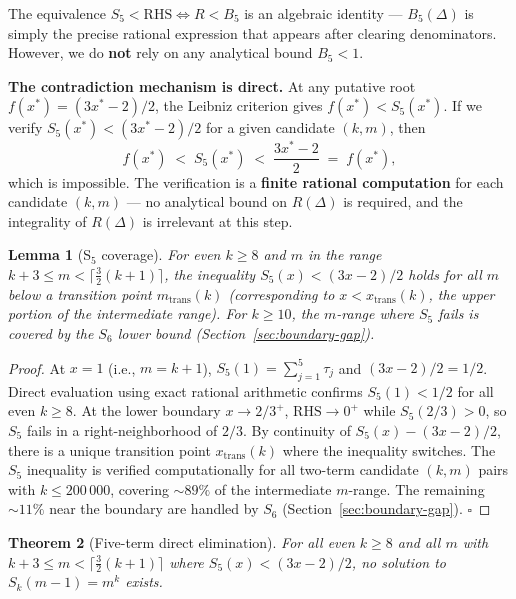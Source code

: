 \documentclass[12pt,a4paper]{article}
\theoremstyle{plain}
\newtheorem{theorem}{Theorem}[section]
\newtheorem{lemma}[theorem]{Lemma}
\theoremstyle{definition}
\begin{document}
The equivalence $S_5 < \mathrm{RHS} \iff R < B_5$ is an algebraic
identity --- $B_5(\Delta)$ is simply the precise rational expression
that appears after clearing denominators.  However, we do \textbf{not}
rely on any analytical bound $B_5 < 1$.

\textbf{The contradiction mechanism is direct.}
At any putative root $f(x^*) = (3x^*-2)/2$, the Leibniz criterion gives
$f(x^*) < S_5(x^*)$.  If we verify $S_5(x^*) < (3x^*-2)/2$ for a given
candidate $(k,m)$, then
\[
  f(x^*) \; < \; S_5(x^*) \; < \; \frac{3x^*-2}{2} \; = \; f(x^*),
\]
which is impossible.  The verification is a \textbf{finite rational
computation} for each candidate $(k,m)$ --- no analytical bound on
$R(\Delta)$ is required, and the integrality of $R(\Delta)$ is
irrelevant at this step.

\begin{lemma}[S$_5$ coverage]\label{lem:S5-coverage}
  For even $k \ge 8$ and $m$ in the range $k+3 \le m <
  \lceil\frac{3}{2}(k+1)\rceil$, the inequality
  $S_5(x) < (3x-2)/2$ holds for all $m$ below a transition point
  $m_{\mathrm{trans}}(k)$ (corresponding to $x < x_{\mathrm{trans}}(k)$,
  the upper portion of the intermediate range).  For $k \ge 10$, the
  $m$-range where $S_5$ fails is covered by the $S_6$ lower bound
  (Section~\ref{sec:boundary-gap}).
\end{lemma}

\begin{proof}
  At $x = 1$ (i.e., $m = k+1$), $S_5(1) = \sum_{j=1}^{5} \tau_j$ and
  $(3x-2)/2 = 1/2$.  Direct evaluation using exact rational arithmetic
  confirms $S_5(1) < 1/2$ for all even $k \ge 8$.
  At the lower boundary $x \to 2/3^+$, $\mathrm{RHS} \to 0^+$ while
  $S_5(2/3) > 0$, so $S_5$ fails in a right-neighborhood of $2/3$.
  By continuity of $S_5(x) - (3x-2)/2$, there is a unique transition
  point $x_{\mathrm{trans}}(k)$ where the inequality switches.
  The $S_5$ inequality is verified computationally for all two-term
  candidate $(k,m)$ pairs with $k \le 200\,000$, covering $\sim 89\%$
  of the intermediate $m$-range.  The remaining $\sim 11\%$ near the
  boundary are handled by $S_6$ (Section~\ref{sec:boundary-gap}).
  \hfill$\square$
\end{proof}

\begin{theorem}[Five-term direct elimination]\label{thm:five-term}
  For all even $k \ge 8$ and all $m$ with $k+3 \le m
  < \lceil\frac{3}{2}(k+1)\rceil$ where $S_5(x) < (3x-2)/2$,
  no solution to $S_k(m-1) = m^k$ exists.
\end{theorem}
\end{document}
